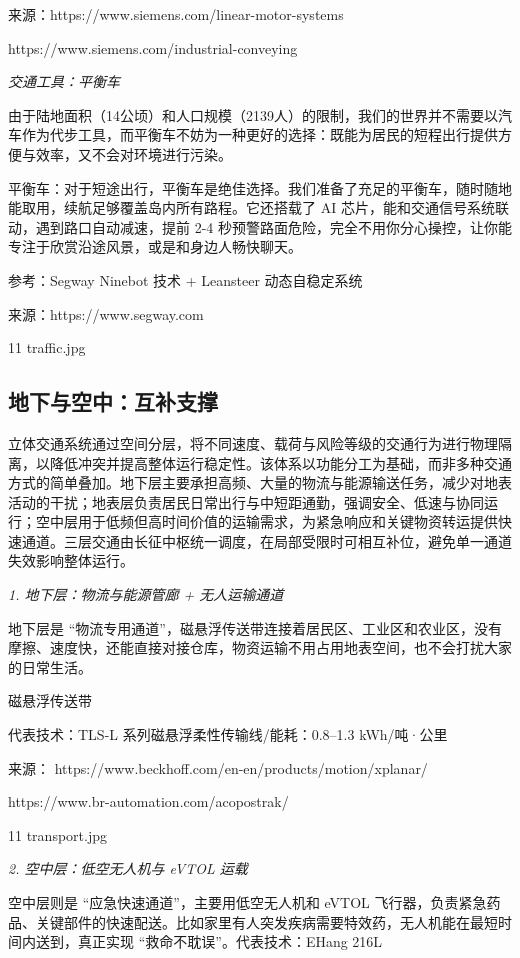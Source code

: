 来源：https://www.siemens.com/linear-motor-systems

https://www.siemens.com/industrial-conveying

\emph{交通工具：平衡车}

由于陆地面积（14公顷）和人口规模（2139人）的限制，我们的世界并不需要以汽车作为代步工具，而平衡车不妨为一种更好的选择：既能为居民的短程出行提供方便与效率，又不会对环境进行污染。

平衡车：对于短途出行，平衡车是绝佳选择。我们准备了充足的平衡车，随时随地能取用，续航足够覆盖岛内所有路程。它还搭载了 AI 芯片，能和交通信号系统联动，遇到路口自动减速，提前 2-4 秒预警路面危险，完全不用你分心操控，让你能专注于欣赏沿途风景，或是和身边人畅快聊天。

参考：Segway Ninebot 技术 + Leansteer 动态自稳定系统

来源：https://www.segway.com

11 traffic.jpg

\subsection{地下与空中：互补支撑}\label{ux5730ux4e0bux4e0eux7a7aux4e2dux4e92ux8865ux652fux6491}

立体交通系统通过空间分层，将不同速度、载荷与风险等级的交通行为进行物理隔离，以降低冲突并提高整体运行稳定性。该体系以功能分工为基础，而非多种交通方式的简单叠加。地下层主要承担高频、大量的物流与能源输送任务，减少对地表活动的干扰；地表层负责居民日常出行与中短距通勤，强调安全、低速与协同运行；空中层用于低频但高时间价值的运输需求，为紧急响应和关键物资转运提供快速通道。三层交通由长征中枢统一调度，在局部受限时可相互补位，避免单一通道失效影响整体运行。

\emph{1. 地下层：物流与能源管廊 + 无人运输通道}

地下层是 ``物流专用通道''，磁悬浮传送带连接着居民区、工业区和农业区，没有摩擦、速度快，还能直接对接仓库，物资运输不用占用地表空间，也不会打扰大家的日常生活。

磁悬浮传送带

代表技术：TLS-L 系列磁悬浮柔性传输线/能耗：0.8--1.3 kWh/吨·公里

来源： https://www.beckhoff.com/en-en/products/motion/xplanar/

https://www.br-automation.com/acopostrak/

11 transport.jpg

\emph{2. 空中层：低空无人机与 eVTOL 运载}

空中层则是 ``应急快速通道''，主要用低空无人机和 eVTOL 飞行器，负责紧急药品、关键部件的快速配送。比如家里有人突发疾病需要特效药，无人机能在最短时间内送到，真正实现 ``救命不耽误''。代表技术：EHang 216L

